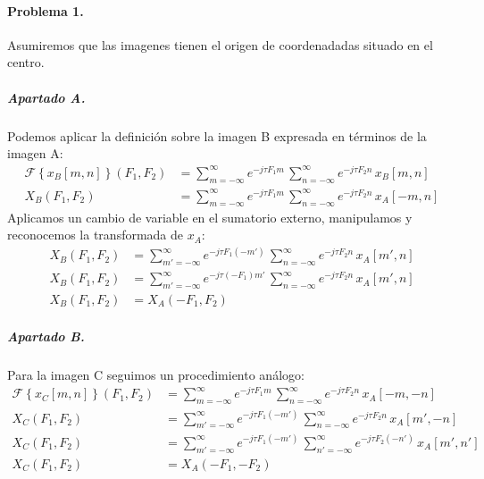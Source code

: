


\startpage

\paragraph{Problema 1.}

Asumiremos que las imagenes tienen el origen de coordenadadas situado en el centro.

\subparagraph{Apartado A.}

Podemos aplicar la definición sobre la imagen B expresada en términos de la imagen A:
%
\begin{align*}
  \mathcal{F}\left\{ x_B[m, n] \right\}(F_1, F_2) &=
  \sum_{m=-\infty}^{\infty} e^{-j\tau F_1 m} \,
  \sum_{n=-\infty}^{\infty} e^{-j\tau F_2 n} \,
  x_B[m, n]
\\
  X_B(F_1, F_2) &=
  \sum_{m=-\infty}^{\infty} e^{-j\tau F_1 m} \,
  \sum_{n=-\infty}^{\infty} e^{-j\tau F_2 n} \,
  x_A[-m, n]
\end{align*}
%
Aplicamos un cambio de variable en el sumatorio externo, manipulamos y reconocemos
la transformada de $x_A$:
%
\begin{align*}
  X_B(F_1, F_2) &=
  \sum_{m'=-\infty}^{\infty} e^{-j\tau F_1 (-m')} \,
  \sum_{n=-\infty}^{\infty} e^{-j\tau F_2 n} \,
  x_A[m', n]
\\
  X_B(F_1, F_2) &=
  \sum_{m'=-\infty}^{\infty} e^{-j\tau (-F_1) m'} \,
  \sum_{n=-\infty}^{\infty} e^{-j\tau F_2 n} \,
  x_A[m', n]
\\
  X_B(F_1, F_2) &= X_A(-F_1, F_2)
\end{align*}

\subparagraph{Apartado B.}

Para la imagen C seguimos un procedimiento análogo:
%
\begin{align*}
  \mathcal{F}\left\{ x_C[m, n] \right\}(F_1, F_2) &=
  \sum_{m=-\infty}^{\infty} e^{-j\tau F_1 m} \,
  \sum_{n=-\infty}^{\infty} e^{-j\tau F_2 n} \,
  x_A[-m, -n]
\\
  X_C(F_1, F_2) &=
  \sum_{m'=-\infty}^{\infty} e^{-j\tau F_1 (-m')} \,
  \sum_{n=-\infty}^{\infty} e^{-j\tau F_2 n} \,
  x_A[m', -n]
\\
  X_C(F_1, F_2) &=
  \sum_{m'=-\infty}^{\infty} e^{-j\tau F_1 (-m')} \,
  \sum_{n'=-\infty}^{\infty} e^{-j\tau F_2 (-n')} \,
  x_A[m', n']
\\
  X_C(F_1, F_2) &= X_A(-F_1, -F_2)
\end{align*}

